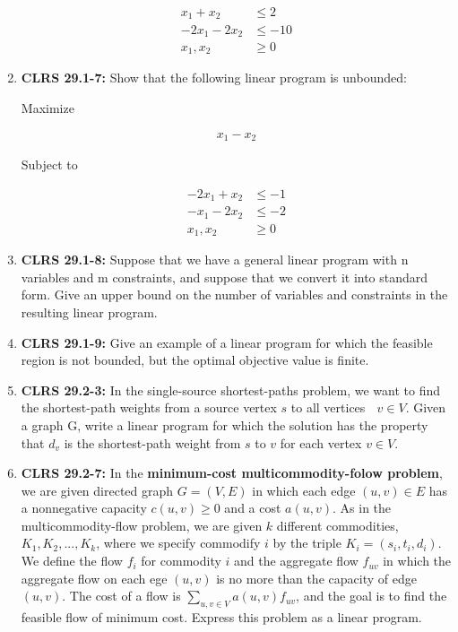 \documentclass[12pt]{article}
\begin{document}
\begin{enumerate}[1.]
    \begin{align*}
        x_1 + x_2 &\leq 2\\
        -2x_1 - 2x_2 &\leq -10\\
        x_1, x_2 &\geq 0
    \end{align*}

    \item \textbf{CLRS 29.1-7:} Show that the following linear program is unbounded:

    \bigskip

    Maximize

    \begin{align*}
        x_1 - x_2
    \end{align*}

    Subject to

    \begin{align*}
        -2x_1 + x_2 &\leq -1\\
        -x_1 - 2x_2 &\leq -2\\
        x_1,x_2 &\geq 0
    \end{align*}

    \item \textbf{CLRS 29.1-8:} Suppose that we have a general linear program with n variables and m constraints,
    and suppose that we convert it into standard form. Give an upper bound on the
    number of variables and constraints in the resulting linear program.

    \item \textbf{CLRS 29.1-9:} Give an example of a linear program for which the feasible region is not bounded,
    but the optimal objective value is finite.

    \item \textbf{CLRS 29.2-3:} In the single-source shortest-paths problem, we want to find the shortest-path
    weights from a source vertex $s$ to all vertices  $v \in V$. Given a graph G, write a
    linear program for which the solution has the property that $d_v$ is the shortest-path
    weight from $s$ to $v$ for each vertex $v \in V$.

    \item \textbf{CLRS 29.2-7:} In the \textbf{minimum-cost multicommodity-folow problem}, we are given directed
    graph $G = (V,E)$ in which each edge $(u,v) \in E$ has a nonnegative capacity $c(u,v) \geq 0$
    and a cost $a(u,v)$. As in the multicommodity-flow problem, we are given $k$
    different commodities, $K_1, K_2, ..., K_k$, where we specify commodify $i$ by
    the triple $K_i = (s_i, t_i, d_i)$. We define the flow $f_i$ for commodity $i$ and
    the aggregate flow $f_{uv}$ in which the aggregate flow on each ege $(u,v)$ is no more than the
    capacity of edge $(u,v)$. The cost of a flow is $\sum\limits_{u,v \in V} a(u,v)f_{uv}$, and
    the goal is to find the feasible flow of minimum cost. Express this problem as a linear
    program.

\end{enumerate}
\end{document}
